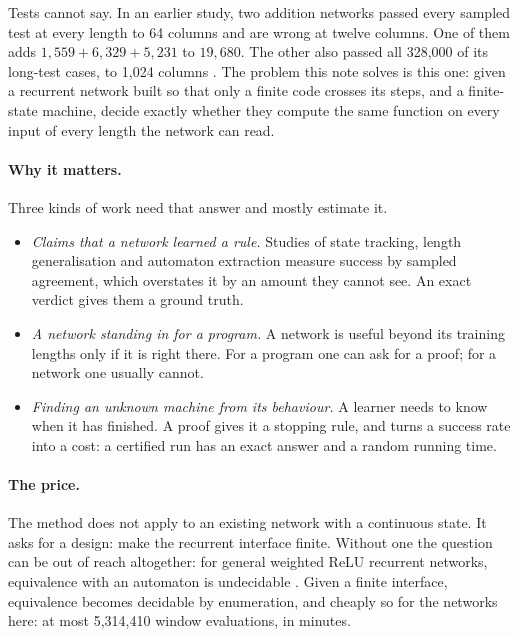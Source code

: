 \documentclass[11pt]{article}
\newcommand{\pn}[2]{#2}
\theoremstyle{definition}
\begin{document}
Tests cannot say. In an earlier study, two addition networks passed every sampled test at every
length to 64 columns and are wrong at twelve columns. One of them adds $1{,}559 + 6{,}329 + 5{,}231$
to $19{,}680$. The other also passed all 328{,}000 of its long-test cases, to 1{,}024 columns
\citep[Appendix B]{barkhuizen-2026-learning-transducers-with-proof}. The problem this note solves is
this one: given a recurrent network built so that only a finite code crosses its steps, and a
finite-state machine, decide exactly whether they compute the same function on every input of every
length the network can read.

\paragraph{Why it matters.} Three kinds of work need that answer and mostly estimate it.
\begin{itemize}
\item \emph{Claims that a network learned a rule.} Studies of state tracking, length generalisation
and automaton extraction measure success by sampled agreement, which overstates it by an amount they
cannot see. An exact verdict gives them a ground truth.
\item \emph{A network standing in for a program.} A network is useful beyond its training lengths
only if it is right there. For a program one can ask for a proof; for a network one usually cannot.
\item \emph{Finding an unknown machine from its behaviour.} A learner needs to know when it has
finished. A proof gives it a stopping rule, and turns a success rate into a cost: a certified run has
an exact answer and a random running time.
\end{itemize}

\paragraph{The price.} The method does not apply to an existing network with a continuous state. It
asks for a design: make the recurrent interface finite. Without one the question can be out of reach
altogether: for general weighted ReLU recurrent networks, equivalence with an automaton is undecidable
\citep{marzouk-2020-distance-equivalence-fsm-rnn}. Given a finite interface, equivalence becomes decidable by
enumeration, and cheaply so for the networks here: at most \pn{recert-largest-entries}{5{,}314{,}410}
window evaluations, in minutes.
\end{document}
